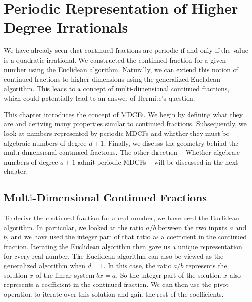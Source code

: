 \chapter{Periodic Representation of Higher Degree Irrationals}

We have already seen that continued fractions are periodic if and only if the
value is a quadratic irrational.
We constructed the continued fraction for a given number using the Euclidean
algorithm.
Naturally, we can extend this notion of continued fractions to higher
dimensions using the generalized Euclidean algorithm.
This leads to a concept of multi-dimensional continued fractions, which could
potentially lead to an answer of Hermite's question.

This chapter introduces the concept of MDCFs.
We begin by defining what they are and deriving many properties similar to
continued fractions.
Subsequently, we look at numbers represented by periodic MDCFs and whether they
must be algebraic numbers of degree $d+1$.
Finally, we discuss the geometry behind the multi-dimensional continued fractions.
The other direction -- Whether algebraic numbers of degree $d+1$ admit periodic
MDCFs -- will be discussed in the next chapter.

\section{Multi-Dimensional Continued Fractions}

To derive the continued fraction for a real number, we have used the Euclidean algorithm.
In particular, we looked at the ratio $a/b$ between the two inputs $a$ and $b$,
and we have used the integer part of that ratio as a coefficient in the
continued fraction.
Iterating the Euclidean algorithm then gave us a unique representation for
every real number.
The Euclidean algorithm can also be viewed as the generalized algorithm when $d = 1$.
In this case, the ratio $a/b$ represents the solution $x$ of the linear system $bx = a$.
So the integer part of the solution $x$ also represents a coefficient in the
continued fraction.
We can then use the pivot operation to iterate over this solution and gain the
rest of the coefficients.

